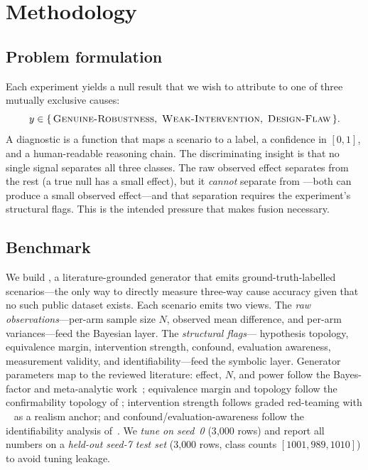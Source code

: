 \section{Methodology}
\label{sec:method}

\subsection{Problem formulation}

Each experiment yields a null result that we wish to attribute to one of three
mutually exclusive causes:
\[
y \in \{\,\textsc{Genuine-Robustness},\ \textsc{Weak-Intervention},\ \textsc{Design-Flaw}\,\}.
\]
A diagnostic is a function that maps a scenario to a label, a confidence in
$[0,1]$, and a human-readable reasoning chain. The discriminating insight is that
no single signal separates all three classes. The raw observed effect separates
\GR from the rest (a true null has a small effect), but it \emph{cannot} separate
\WI from \DF---both can produce a small observed effect---and that separation
requires the experiment's structural flags. This is the intended pressure that
makes fusion necessary.

\subsection{Benchmark}
\label{sec:data}

We build \nullbench, a literature-grounded generator that emits
ground-truth-labelled scenarios---the only way to directly measure three-way cause
accuracy given that no such public dataset exists. Each scenario emits two views.
The \emph{raw observations}---per-arm sample size $N$, observed mean difference,
and per-arm variances---feed the Bayesian layer. The \emph{structural flags}---
hypothesis topology, equivalence margin, intervention strength, confound,
evaluation awareness, measurement validity, and identifiability---feed the
symbolic layer. Generator parameters map to the reviewed literature: effect, $N$,
and power follow the Bayes-factor and meta-analytic
work~\citep{rouder2009bayesian, vandeschoot2025bf}; equivalence margin and
topology follow the confirmability topology of
\citet{dale2024confirming}; intervention strength follows graded red-teaming with
\harmbench~\citep{mazeika2024harmbench} as a realism anchor; and
confound/evaluation-awareness follow the identifiability analysis
of~\citet{santosgrueiro2026limits}. We \emph{tune on seed~0} (3{,}000 rows) and
report all numbers on a \emph{held-out seed-7 test set} (3{,}000 rows, class
counts $[1001, 989, 1010]$) to avoid tuning leakage.

